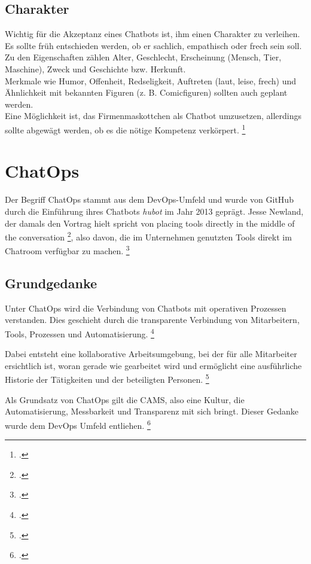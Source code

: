 \subsection{Charakter}
Wichtig für die Akzeptanz eines Chatbots ist, ihm einen Charakter zu verleihen. Es sollte früh entschieden werden, ob er sachlich, empathisch oder frech sein soll.\\
Zu den Eigenschaften zählen Alter, Geschlecht, Erscheinung (Mensch, Tier, Maschine), Zweck und Geschichte bzw. Herkunft.\\
Merkmale wie Humor, Offenheit, Redseligkeit, Auftreten (laut, leise, frech) und Ähnlichkeit mit bekannten Figuren (z. B. Comicfiguren) sollten auch geplant werden.\\
Eine Möglichkeit ist, das Firmenmaskottchen als Chatbot umzusetzen, allerdings sollte abgewägt werden, ob es die nötige Kompetenz verkörpert.
\footcite[Vgl.][68\psq]{Puscher_2018_Gut_zugehoert}




\section{ChatOps}
Der Begriff ChatOps stammt aus dem DevOps-Umfeld und wurde von GitHub durch die Einführung ihres Chatbots \textit{hubot} im Jahr 2013 geprägt. Jesse Newland, der damals den Vortrag hielt spricht von \glqq{}placing tools
directly in the middle of the conversation\grqq
\footcite[Vgl.][62]{Github_2013_Chatops},
also davon, die im Unternehmen genutzten Tools direkt im Chatroom verfügbar zu machen.
\footcite[Vgl.][o. \pno]{Sigler_2014_Chatops}

\subsection{Grundgedanke}
Unter ChatOps wird die Verbindung von Chatbots mit operativen Prozessen verstanden. Dies geschieht durch die transparente Verbindung von Mitarbeitern, Tools, Prozessen und Automatisierung.
\footcite[Vgl.][o. \pno]{Zyane_2017_ChatOps}

Dabei entsteht eine kollaborative Arbeitsumgebung, bei der für alle Mitarbeiter ersichtlich ist, woran gerade wie gearbeitet wird und ermöglicht eine ausführliche Historie der Tätigkeiten und der beteiligten Personen.
\footcite[Vgl.][190]{Betz_2016_Digital}

Als Grundsatz von ChatOps gilt die \acf{CAMS}, also eine Kultur, die Automatisierung, Messbarkeit und Transparenz mit sich bringt. Dieser Gedanke wurde dem DevOps Umfeld entliehen.
\footcite[Vgl.][o. \pno]{Zyane_2017_ChatOps}

